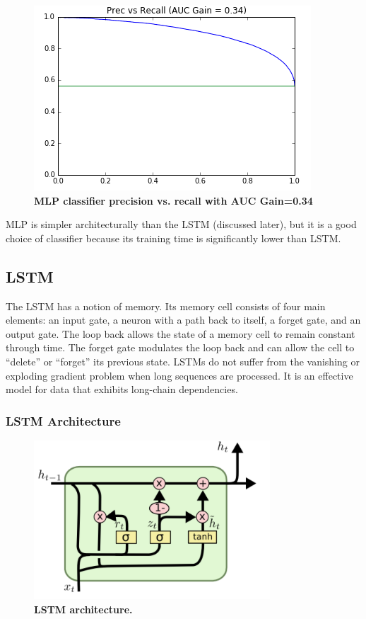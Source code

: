 \documentclass{sig-alternate-05-2015}
\begin{document}
	
	\begin{figure}[H]
		\centering\includegraphics[scale=0.55]{prrc_nn} 
		\caption{\textbf{MLP classifier precision vs. recall with AUC Gain=0.34 }}
	\end{figure}
	
	MLP is simpler architecturally than the LSTM (discussed later), but it is a good choice of classifier because its training time is significantly lower than LSTM.
		

	
	
	\subsection{LSTM}
	The LSTM has a notion of memory. Its memory cell consists of four main elements: an input gate, a neuron with a path back to itself, a forget gate, and an output gate. The loop back allows the state of a memory cell to remain constant through time. The forget gate modulates the loop back and can allow the cell to “delete” or “forget” its previous state. LSTMs do not suffer from the vanishing or exploding gradient problem when long sequences are processed. It is an effective model for data that exhibits long-chain dependencies.  
	\subsubsection{LSTM Architecture}
	\begin{figure}[H]
		\centering\includegraphics[scale=0.5]{lstm_image} 
		\caption{\textbf{ LSTM architecture.}}
	\end{figure}
	
\end{document}
